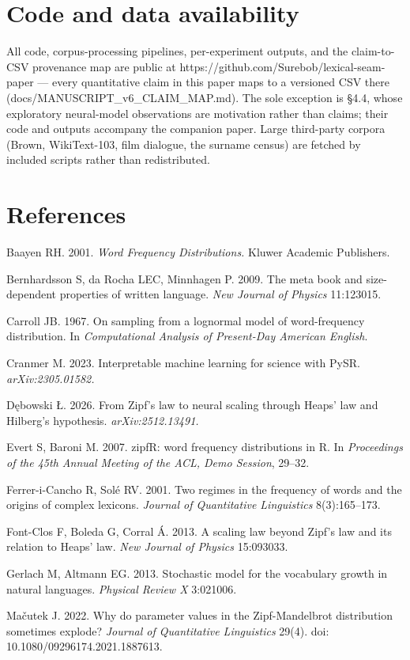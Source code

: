 \documentclass[11pt]{article}
\begin{document}
\section{Code and data availability}
All code, corpus-processing pipelines, per-experiment outputs, and the claim-to-CSV provenance map are public at https://github.com/Surebob/lexical-seam-paper --- every quantitative claim in this paper maps to a versioned CSV there (docs/MANUSCRIPT\_v6\_CLAIM\_MAP.md). The sole exception is \S4.4, whose exploratory neural-model observations are motivation rather than claims; their code and outputs accompany the companion paper. Large third-party corpora (Brown, WikiText-103, film dialogue, the surname census) are fetched by included scripts rather than redistributed.

\section*{References}
Baayen RH. 2001. \emph{Word Frequency Distributions.} Kluwer Academic Publishers.

Bernhardsson S, da Rocha LEC, Minnhagen P. 2009. The meta book and size-dependent properties of written language. \emph{New Journal of Physics} 11:123015.

Carroll JB. 1967. On sampling from a lognormal model of word-frequency distribution. In \emph{Computational Analysis of Present-Day American English}.

Cranmer M. 2023. Interpretable machine learning for science with PySR. \emph{arXiv:2305.01582.}

Dębowski Ł. 2026. From Zipf's law to neural scaling through Heaps' law and Hilberg's hypothesis. \emph{arXiv:2512.13491.}

Evert S, Baroni M. 2007. zipfR: word frequency distributions in R. In \emph{Proceedings of the 45th Annual Meeting of the ACL, Demo Session}, 29--32.

Ferrer-i-Cancho R, Solé RV. 2001. Two regimes in the frequency of words and the origins of complex lexicons. \emph{Journal of Quantitative Linguistics} 8(3):165--173.

Font-Clos F, Boleda G, Corral Á. 2013. A scaling law beyond Zipf's law and its relation to Heaps' law. \emph{New Journal of Physics} 15:093033.

Gerlach M, Altmann EG. 2013. Stochastic model for the vocabulary growth in natural languages. \emph{Physical Review X} 3:021006.

Mačutek J. 2022. Why do parameter values in the Zipf-Mandelbrot distribution sometimes explode? \emph{Journal of Quantitative Linguistics} 29(4). doi: 10.1080/09296174.2021.1887613.
\end{document}
